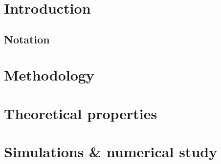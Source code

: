 \setcounter{page}{1}

\section{Introduction}

\subsection{Notation}

\section{Methodology}

\section{Theoretical properties}

\section{Simulations \& numerical study}